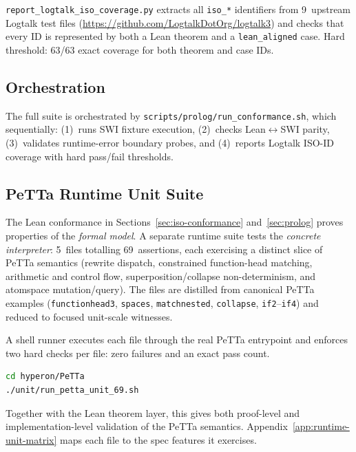 \documentclass[]{article}
\newcommand{\code}[1]{\texttt{#1}}
\newcommand{\PeTTa}{\textup{PeTTa}}
\begin{document}
\code{report\_logtalk\_iso\_coverage.py} extracts all \code{iso\_*}
identifiers from 9~upstream Logtalk test files
(\url{https://github.com/LogtalkDotOrg/logtalk3}) and checks that every
ID is represented by both a Lean theorem and a \code{lean\_aligned}
case.  Hard threshold: 63/63 exact coverage for both theorem and case
IDs.

\subsection{Orchestration}

The full suite is orchestrated by \code{scripts/prolog/run\_conformance.sh},
which sequentially: (1)~runs SWI fixture execution, (2)~checks
Lean$\leftrightarrow$SWI parity, (3)~validates runtime-error boundary
probes, and (4)~reports Logtalk ISO-ID coverage with hard pass/fail
thresholds.

\subsection{PeTTa Runtime Unit Suite}
\label{sec:petta-runtime-unit}

The Lean conformance in Sections~\ref{sec:iso-conformance}
and~\ref{sec:prolog} proves properties of the \emph{formal model}.
A separate runtime suite tests the \emph{concrete interpreter}: 5~files
totalling 69~assertions, each exercising a distinct slice of \PeTTa{}
semantics (rewrite dispatch, constrained function-head matching,
arithmetic and control flow, superposition/collapse non-determinism, and
atomspace mutation/query).  The files are distilled from canonical
\PeTTa{} examples (\code{functionhead3}, \code{spaces},
\code{matchnested}, \code{collapse}, \code{if2}--\code{if4}) and
reduced to focused unit-scale witnesses.

A shell runner executes each file through the real \PeTTa{} entrypoint
and enforces two hard checks per file: zero failures and an exact pass
count.

\begin{lstlisting}[language=bash]
cd hyperon/PeTTa
./unit/run_petta_unit_69.sh
\end{lstlisting}

\noindent
Together with the Lean theorem layer, this gives both proof-level and
implementation-level validation of the \PeTTa{} semantics.
Appendix~\ref{app:runtime-unit-matrix} maps each file to the spec
features it exercises.

\end{document}
